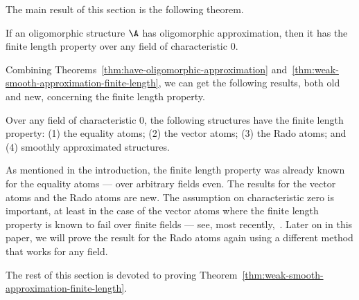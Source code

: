 The main result of this section is the following theorem.

\begin{theorem}\label{thm:weak-smooth-approximation-finite-length}
    If an oligomorphic structure $\A$ has oligomorphic approximation, then it has the finite length property over any field of characteristic $0$.
\end{theorem}

Combining Theorems~\ref{thm:have-oligomorphic-approximation} and~\ref{thm:weak-smooth-approximation-finite-length}, we can get the following results, both old and new, concerning the finite length property.

\begin{corollary}\label{cor:weak-finite-length}
    Over any field of characteristic $0$, the following structures have the finite length property: 
    (1) the equality atoms; (2) the vector atoms; (3) the Rado atoms;
    and (4) smoothly approximated structures.
\end{corollary}

As mentioned in the introduction, the finite length property was already known for the equality atoms --- over arbitrary fields even. The results for the vector atoms and the Rado atoms are new. The assumption on characteristic zero is important, at least in the case of the vector atoms where  the finite length property is known to fail over finite fields --- see, most recently,~\cite[Sec.~4.4]{BFKM24}. Later on in this paper, we will prove the result for the Rado atoms again using a different method that works for any field.

The rest of this section is devoted to proving Theorem~\ref{thm:weak-smooth-approximation-finite-length}.

